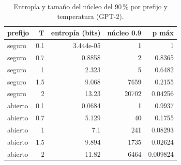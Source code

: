 \begin{table}[H]\centering\caption{Entropía y tamaño del núcleo del 90\,\% por prefijo y temperatura (GPT-2).}\label{tab:p0}
{\footnotesize\setlength{\tabcolsep}{3.5pt}
\begin{tabular}{lrrrr}
\hline
prefijo & T & entropía (bits) & núcleo 0.9 & p máx \\
\hline
seguro & 0.1 & 3.444e-05 & 1 & 1 \\
seguro & 0.7 & 0.8858 & 2 & 0.8365 \\
seguro & 1 & 2.323 & 5 & 0.6482 \\
seguro & 1.5 & 9.068 & 7659 & 0.2155 \\
seguro & 2 & 13.23 & 20702 & 0.04256 \\
abierto & 0.1 & 0.0684 & 1 & 0.9937 \\
abierto & 0.7 & 5.129 & 40 & 0.1755 \\
abierto & 1 & 7.1 & 241 & 0.08293 \\
abierto & 1.5 & 9.894 & 1735 & 0.02624 \\
abierto & 2 & 11.82 & 6464 & 0.009824 \\
\hline
\end{tabular}
}\end{table}
